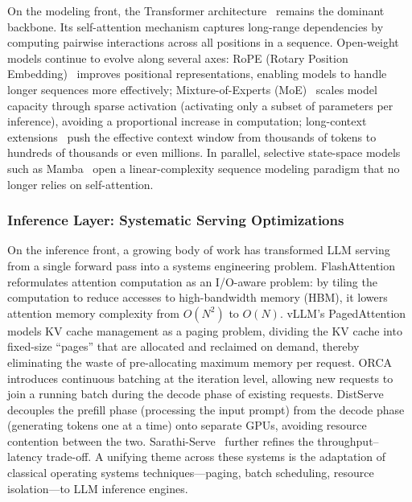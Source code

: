 \documentclass[11pt,a4paper]{article}
\begin{document}
On the modeling front, the Transformer architecture~\cite{vaswani2017attention} remains the dominant backbone.
Its self-attention mechanism captures long-range dependencies by computing pairwise interactions across all positions in a sequence.
Open-weight models continue to evolve along several axes: RoPE (Rotary Position Embedding)~\cite{su2021roformer} improves positional representations, enabling models to handle longer sequences more effectively; Mixture-of-Experts (MoE)~\cite{switch2022,mixtral2024} scales model capacity through sparse activation (activating only a subset of parameters per inference), avoiding a proportional increase in computation; long-context extensions~\cite{yarn2024,longrope2024} push the effective context window from thousands of tokens to hundreds of thousands or even millions.
In parallel, selective state-space models such as Mamba~\cite{gu2024mamba} open a linear-complexity sequence modeling paradigm that no longer relies on self-attention.

\subsubsection{Inference Layer: Systematic Serving Optimizations}

On the inference front, a growing body of work has transformed LLM serving from a single forward pass into a systems engineering problem.
FlashAttention~\cite{dao2022flashattention,dao2023flashattention2} reformulates attention computation as an I/O-aware problem: by tiling the computation to reduce accesses to high-bandwidth memory (HBM), it lowers attention memory complexity from $O(N^2)$ to $O(N)$.
vLLM's PagedAttention~\cite{kwon2023pagedattention} models KV cache management as a paging problem, dividing the KV cache into fixed-size ``pages'' that are allocated and reclaimed on demand, thereby eliminating the waste of pre-allocating maximum memory per request.
ORCA~\cite{orca2022} introduces continuous batching at the iteration level, allowing new requests to join a running batch during the decode phase of existing requests.
DistServe~\cite{zhong2024distserve} decouples the prefill phase (processing the input prompt) from the decode phase (generating tokens one at a time) onto separate GPUs, avoiding resource contention between the two.
Sarathi-Serve~\cite{agrawal2024sarathi} further refines the throughput--latency trade-off.
A unifying theme across these systems is the adaptation of classical operating systems techniques---paging, batch scheduling, resource isolation---to LLM inference engines.
\end{document}
